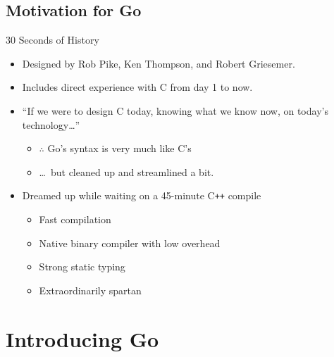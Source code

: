 \documentclass[pdf]{beamer}
\begin{document}
\subsection{Motivation for Go}
\begin{frame}{30 Seconds of History}
    \begin{itemize}
        \item Designed by Rob Pike, Ken Thompson, and Robert Griesemer.
        \item Includes direct experience with C from day 1 to now.
            \pause
        \item ``If we were to design C today, knowing what we know now, on today's technology\dots''
            \pause
            \begin{itemize}
        \item $\therefore$ Go's syntax is very much like C's
        \item \dots\ but cleaned up and streamlined a bit.
            \end{itemize}
        \pause
    \item Dreamed up while waiting on a 45-minute C\texttt{++} compile
        \pause
            \begin{itemize}
                \item Fast compilation
                \item Native binary compiler with low overhead
                \item Strong static typing
                \item Extraordinarily spartan
            \end{itemize}
    \end{itemize}
\end{frame}
\section{Introducing Go}
\end{document}

